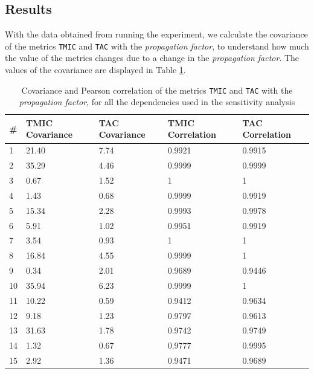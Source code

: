 \subsection{Results}
With the data obtained from running the experiment, we calculate the covariance of the metrics \texttt{TMIC} and \texttt{TAC} with the \textit{propagation factor}, to understand how much the value of the metrics changes due to a change in the \textit{propagation factor}. The values of the covariance are displayed in Table \ref{table:covariance-sensitivity}.

\begin{table}[ht!]
\begin{center}
\begin{tabular}{|l|l|l|l|l|}
\hline
\# & \textbf{TMIC Covariance} & \textbf{TAC Covariance} & \textbf{TMIC Correlation} & \textbf{TAC Correlation}\\ \hline
1   & 21.40 & 7.74 & 0.9921 & 0.9915 \\ \hline
2   & 35.29 & 4.46 & 0.9999 & 0.9999 \\ \hline
3   & 0.67  & 1.52 & 1      & 1      \\ \hline
4   & 1.43  & 0.68 & 0.9999 & 0.9919 \\ \hline
5   & 15.34 & 2.28 & 0.9993 & 0.9978 \\ \hline
6   & 5.91  & 1.02 & 0.9951 & 0.9919 \\ \hline
7   & 3.54  & 0.93 & 1      & 1      \\ \hline
8   & 16.84 & 4.55 & 0.9999 & 1      \\ \hline
9   & 0.34  & 2.01 & 0.9689 & 0.9446 \\ \hline
10  & 35.94 & 6.23 & 0.9999 & 1      \\ \hline
11  & 10.22 & 0.59 & 0.9412 & 0.9634 \\ \hline
12  & 9.18  & 1.23 & 0.9797 & 0.9613 \\ \hline
13  & 31.63 & 1.78 & 0.9742 & 0.9749 \\ \hline
14  & 1.32  & 0.67 & 0.9777 & 0.9995 \\ \hline
15  & 2.92  & 1.36 & 0.9471 & 0.9689 \\ \hline
\end{tabular}
\end{center}
\caption{Covariance and Pearson correlation of the metrics \texttt{TMIC} and \texttt{TAC} with the \textit{propagation factor}, for all the dependencies used in the sensitivity analysis}
\label{table:covariance-sensitivity}
\end{table}


